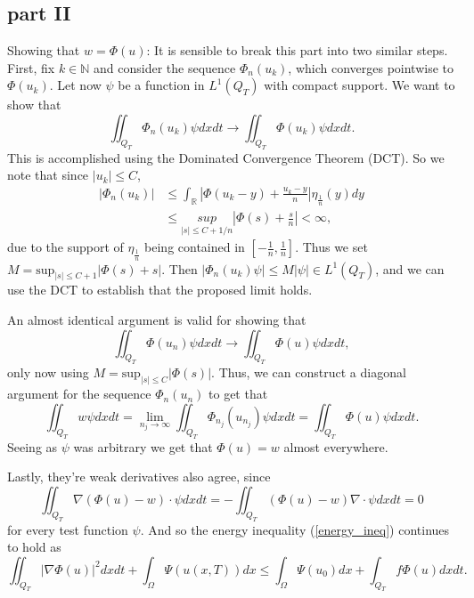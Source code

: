 \documentclass[11pt, a4paper]{article}
\begin{document}
\begin{appendices}
\subsection{part II}
 
	\item[Showing that $w=\Phi(u)$:] It is sensible to break this part into two similar steps. First, fix $k \in \mathbb{N}$ and consider the sequence $\Phi_n(u_k)$, which converges pointwise to $\Phi(u_k)$. Let now $\psi$ be a function in $L^1(Q_T)$ with compact support. We want to show that
	\begin{equation*}
	\iint_{Q_T} \Phi_n(u_k) \psi dxdt \to \iint_{Q_T}\Phi(u_k)\psi dxdt.
	\end{equation*}
	This is accomplished using the Dominated Convergence Theorem (DCT). So we note that since $|u_k| \leq C$, 
	\begin{align*}
    |\Phi_n(u_k)| &\leq \int_\mathbb{R} \left| \Phi(u_k-y) + \frac{u_k-y}{n}\right|\eta_{\frac{1}{n}}(y)dy \\
    &\leq \underset{|s|\leq C+1/n}{sup}\left| \Phi(s) + \frac{s}{n}\right| < \infty,
	\end{align*}
	due to the support of $\eta_{\frac{1}{n}}$ being contained in $\left[ -\frac{1}{n}, \frac{1}{n}\right]$. Thus we set $M = \mathrm{sup}_{|s|\leq C+1}\left|\Phi(s) + s\right|$. Then $|\Phi_n(u_k)\psi| \leq M|\psi| \in L^1(Q_T)$, and we can use the DCT to establish that the proposed limit holds.
	
	An almost identical argument is valid for showing that
	\begin{equation*}
	\iint_{Q_T}\Phi(u_n)\psi dxdt \to \iint_{Q_T}\Phi(u)\psi dxdt,
	\end{equation*}		
	only now using $M = \mathrm{sup}_{|s|\leq C}|\Phi(s)|$. Thus, we can construct a diagonal argument for the sequence $\Phi_n(u_n)$ to get that
	\begin{equation}
	\iint_{Q_T} w\psi dxdt = \lim_{n_j \to \infty} \iint_{Q_T}\Phi_{n_j}(u_{n_j})\psi dxdt = \iint_{Q_T} \Phi(u) \psi dxdt.
	\end{equation}
	Seeing as $\psi$ was arbitrary we get that $\Phi(u) = w$ almost everywhere.
	
	Lastly, they're weak derivatives also agree, since
	\begin{equation*}
	\iint_{Q_T}\nabla(\Phi(u) - w) \cdot \psi dxdt = -\iint_{Q_T}(\Phi(u)-w)\nabla \cdot \psi dxdt = 0 
	\end{equation*}
	for every test function $\psi$.
	 And so the energy inequality (\ref{energy_ineq}) continues to hold as
	\begin{equation}
	\iint_{Q_T}|\nabla \Phi(u)|^2dxdt + \int_\Omega \Psi(u(x,T))dx \leq \int_\Omega \Psi(u_0)dx + \int_{Q_T} f\Phi(u)dxdt.
	\end{equation}

\end{appendices}
\newpage


\end{document}
